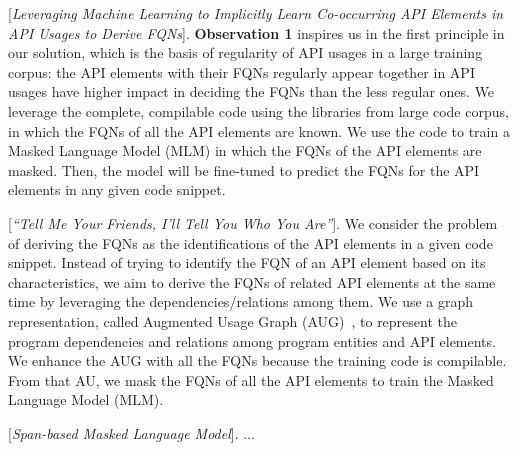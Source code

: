 \vspace{2pt}
 [{\em Leveraging Machine Learning to
    Implicitly Learn Co-occurring API Elements in API Usages to Derive
    FQNs}]. {\bf Observation 1} inspires us in the first principle in
our solution, which is the basis of regularity of API usages in a
large training corpus: the API elements with their FQNs regularly
appear together in API usages have higher impact in deciding the FQNs than
the less regular ones. We leverage the complete, compilable code using
the libraries from large code corpus, in which the FQNs of all the API
elements are known. We use the code to train a Masked Language Model
(MLM) in which the FQNs of the API elements are masked. Then, the
model will be fine-tuned to predict the FQNs for the API elements in
any given code snippet.

\vspace{2pt}
 [{\em ``Tell Me Your Friends, I'll Tell You
    Who You Are''}]. We consider the problem of deriving the FQNs as
the identifications of the API elements in a given code snippet.
Instead of trying to identify the FQN of an API element based on its
characteristics, we aim to derive the FQNs of related API elements at
the same time by leveraging the dependencies/relations among them.  We
use a graph representation, called Augmented Usage Graph
(AUG)~\cite{msr19}, to represent the program dependencies and
relations among program entities and API elements. We enhance the AUG
with all the FQNs because the training code is compilable. From that
AU, we mask the FQNs of all the API elements to train the Masked
Language Model (MLM).

\vspace{2pt}
 [{\em Span-based Masked Language Model}]. ...


